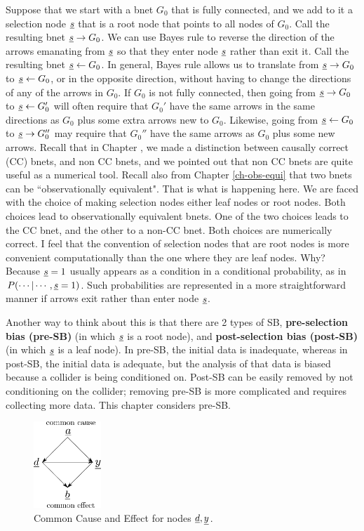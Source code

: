 Suppose that we start with
a bnet $G_0$ that is fully connected, and 
we add to it a selection node ${\underline{s}}$ 
that is a root node that points
to all nodes of $G_0$.
Call the resulting bnet ${\underline{s}}\rightarrow G_0$.
We can use Bayes rule to reverse the direction
of the arrows emanating from ${\underline{s}}$
so that they enter node ${\underline{s}}$ 
rather than exit
it.
Call the resulting bnet ${\underline{s}}\leftarrow G_0$.
In general,
Bayes rule allows us to translate 
from ${\underline{s}}\rightarrow G_0$ to 
${\underline{s}}\leftarrow G_0$,
or in the opposite direction,
without having to change the 
directions of any of the arrows in $G_0$.
If $G_0$ is not fully connected, then
going from
${\underline{s}}\rightarrow G_0$ to 
${\underline{s}}\leftarrow G_0'$ 
will often require that $G_0'$
have the same arrows in the same
directions as $G_0$
plus some extra arrows
new to $G_0$.
Likewise, going
from
${\underline{s}}\leftarrow G_0$ to 
${\underline{s}}\rightarrow G_0''$
may require that $G_0''$ have
the same arrows as $G_0$ plus some new arrows.
Recall that in Chapter ,
we made a distinction
between causally correct (CC)
bnets, and non CC bnets, and
we pointed out
that non CC bnets are
quite useful as
a numerical tool.
Recall also from Chapter
\ref{ch-obs-equi}
that two bnets can be 
``observationally equivalent".
That is what is happening here.
We are faced with 
the choice of
making selection nodes
either 
leaf nodes or root nodes.
Both
choices  lead to observationally
equivalent bnets.
One of the two choices
leads to the 
CC bnet,
and the other to a non-CC bnet.
Both choices are numerically
correct. I feel that
the convention 
of selection
nodes that are root nodes is 
more convenient 
computationally
than the one where they 
are leaf nodes. Why?
Because
${\underline{s}}=1$
usually 
appears as a condition in a conditional
probability,
as in $P(\cdots|\cdots, {\underline{s}}=1)$.
Such probabilities
are represented  in a more
straightforward manner if arrows
exit rather than enter node
${\underline{s}}$.

Another way to think about 
this is that there are 
2 types of SB, {\bf pre-selection bias (pre-SB)}
(in which ${\underline{s}}$ is a root node),
and {\bf post-selection bias (post-SB)}
(in which ${\underline{s}}$ is a leaf node). 
In pre-SB, the
initial data is 
inadequate, whereas in post-SB,
the initial data is adequate, but 
the analysis of that data is biased because
a collider is being conditioned on.
Post-SB can 
be easily removed by not conditioning
on the collider; removing pre-SB 
is more complicated and requires
collecting more data.
This chapter considers pre-SB.

\begin{figure}[h!]
\centering
\includegraphics[width=1in]
{sb-removal/common-cause-effect.png}
\caption{Common Cause 
and Effect for 
nodes ${\underline{d}},{\underline{y}}$.} 
\label{fig-common-cause-effect}
\end{figure}

